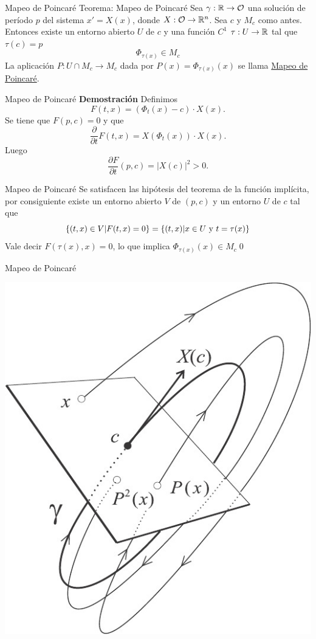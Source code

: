  {Mapeo de Poincaré}
{Teorema: Mapeo de Poincaré}
 Sea $\gamma:\mathbb{R}\to\mathcal{O}$ una solución de período $p$ del sistema $x'=X(x)$, donde $X:\mathcal{O}\to \mathbb{R}^n$. Sea $c$ y $M_c$ como antes. Entonces existe un entorno abierto $U$ de $c$ 
 y una función $C^1$ $\tau:U\to \mathbb{R}$ tal que $\tau(c)=p$
 \[\Phi_{\tau(x)}\in M_c\]
La aplicación $P:U\cap M_c\to M_c$ dada por $P(x)=\Phi_{\tau(x)}(x)$ se llama \href{http://es.wikipedia.org/wiki/Aplicación_de_Poincaré}{Mapeo de Poincaré}.




 {Mapeo de Poincaré}
\textbf{Demostración} Definimos
\[F(t,x)=(\Phi_t(x)-c)\cdot X(x).\]
Se tiene que $F(p,c)=0$ y que
\[\frac{\partial}{\partial t}F(t,x)=X(\Phi_t(x))\cdot X(x).\]
Luego
\[\frac{\partial F}{\partial t}(p,c)=|X(c)|^2>0.\]




 {Mapeo de Poincaré}
Se satisfacen las hipótesis del teorema de la función implícita, por consiguiente existe un entorno abierto $V$ de $(p,c)$  y un entorno $U$ de $c$ tal que
\[\{(t,x)\in V|F(t,x)=0\}=\{(t,x)|x\in U\hbox{ y }t=\tau(x)\}\]
Vale decir $F(\tau(x),x)=0$, lo que implica $\Phi_{\tau(x)}(x)\in M_c$\qed



{Mapeo de Poincaré}
 
   \begin{center}
   \includegraphics[scale=0.3]{imagenes/poincaremap.jpg}
   \end{center}






